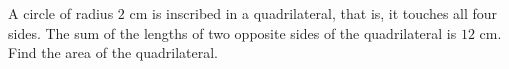 A circle of radius $2$ cm is inscribed in a quadrilateral, that is, it touches all four sides. The sum of the lengths of two opposite sides of the quadrilateral is $12$ cm. Find the area of the quadrilateral.
